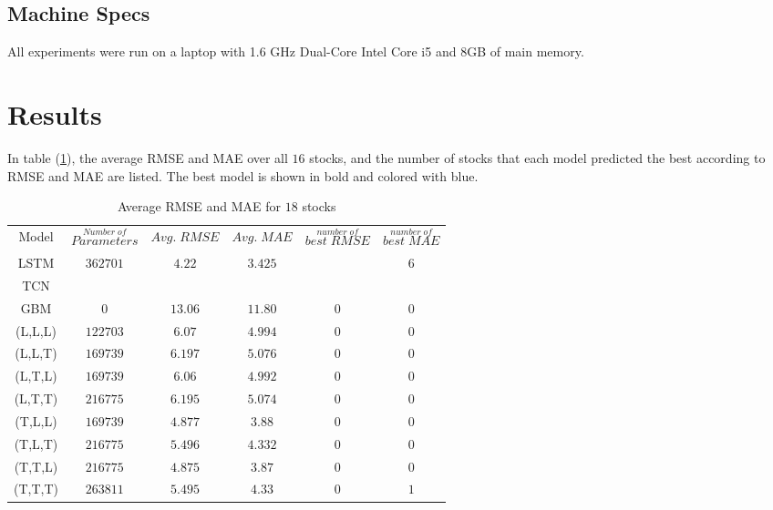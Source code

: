 \documentclass[12pt, A4]{article}
\begin{document}
\subsection{Machine Specs}
All experiments were run on a laptop with 1.6 GHz Dual-Core Intel Core i5 and $8$GB of main memory.

\section{Results}

In table (\ref{Average RMSE_MAE_results}), the average RMSE and MAE over all $16$ stocks, and the number of stocks that each model predicted the best according to RMSE and MAE are listed. The best model is shown in bold and colored with blue.
\begin{table}[H]
	\footnotesize
	\begin{center}
		\begin{tabular}{| c | c | c | c | c | c |}
			\hline 
			Model & $\stackrel{Number\; of}{Parameters}$ & $Avg.\; RMSE$ & $Avg.\; MAE$ & $\stackrel{number\; of}{best\; RMSE}$ & $\stackrel{number \; of}{best\; MAE}$ \\ \cline{1-6}
			LSTM & $362701$& $4.22$ & $3.425$  &\cellcolor{blue!25}  \boldmath{$8$} & $6$ \\ \cline{1-6}
			TCN & \cellcolor{blue!25}  \boldmath{$87937$}&\cellcolor{blue!25}   \boldmath{$3.86$} &\cellcolor{blue!25}   \boldmath{$3.07$} & \cellcolor{blue!25} \boldmath{$8$} & \cellcolor{blue!25}  \boldmath{$9$}  \\ \cline{1-6}
			GBM & $0$ &$13.06$ & $11.80$ & $0$ & $0$ \\ \cline{1-6}
			(L,L,L)& $122703$ & $6.07$ & $4.994$ & $0$ & $0$  \\ \cline{1-6}
			(L,L,T) & $169739$ & $6.197$ & $5.076$  & $0$ & $0$ \\ \cline{1-6}
			(L,T,L) &  $169739$ & $6.06$ & $4.992$  & $0$ & $0$ \\ \cline{1-6}
			(L,T,T) & $216775$ & $6.195$ & $5.074$  & $0$ & $0$ \\ \cline{1-6}
			(T,L,L) & $169739$ & $4.877$ & $3.88$  & $0$ & $0$ \\ \cline{1-6}
			(T,L,T) & $216775$ & $5.496$ & $4.332$  & $0$ & $0$ \\ \cline{1-6}
			(T,T,L) & $216775$ & $4.875$ & $3.87$  & $0$ & $0$ \\ \cline{1-6}
			(T,T,T) & $263811$ & $5.495$ & $4.33$  & $0$ & $1$ \\ \cline{1-6}			
		\end{tabular}
		\caption{Average RMSE and MAE for $18$ stocks} \label{Average RMSE_MAE_results}
	\end{center}
\end{table}
\end{document}
